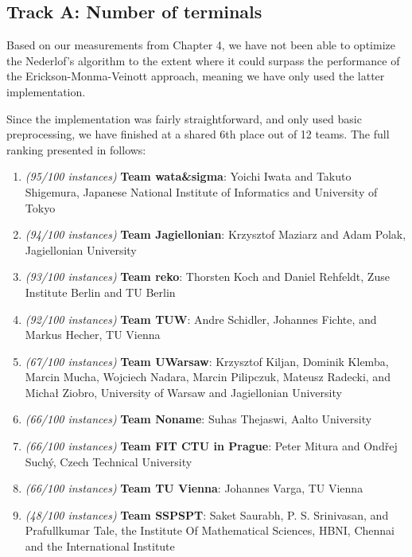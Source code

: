 \documentclass[thesis=M,english,hidelinks]{FITthesis}[2012/10/20]
\theoremstyle{definition}
\begin{document}
\subsection{Track A: Number of terminals}

Based on our measurements from Chapter 4, we have not been able to optimize the Nederlof's algorithm to the extent where
it could surpass the performance of the Erickson-Monma-Veinott approach, meaning we have only used the latter
implementation.

Since the implementation was fairly straightforward, and only used basic preprocessing, we have finished at a shared 6th
place out of 12 teams. The full ranking presented in \cite{PaceReport} follows:

\begin{enumerate}
    \item
        \emph{(95/100 instances)} \textbf{Team wata\&sigma}: Yoichi Iwata and Takuto Shigemura, Japanese
        National Institute of Informatics and University of Tokyo
    \item
        \emph{(94/100 instances)} \textbf{Team Jagiellonian}: Krzysztof Maziarz and Adam Polak, Jagiellonian University
    \item
        \emph{(93/100 instances)} \textbf{Team reko}: Thorsten Koch and Daniel Rehfeldt, Zuse Institute Berlin and TU Berlin
    \item
        \emph{(92/100 instances)} \textbf{Team TUW}: Andre Schidler, Johannes Fichte, and Markus Hecher, TU Vienna
    \item
        \emph{(67/100 instances)} \textbf{Team UWarsaw}: Krzysztof Kiljan, Dominik Klemba, Marcin Mucha, Wojciech Nadara, Marcin
        Pilipczuk, Mateusz Radecki, and Michał Ziobro, University of Warsaw and Jagiellonian University
    \item
        \emph{(66/100 instances)} \textbf{Team Noname}: Suhas Thejaswi, Aalto University
        \addtocounter{enumi}{-1}
    \item
        \emph{(66/100 instances)} \textbf{Team FIT CTU in Prague}: Peter Mitura and Ondřej Suchý, Czech Technical University
        \addtocounter{enumi}{-1}
    \item
        \emph{(66/100 instances)} \textbf{Team TU Vienna}: Johannes Varga, TU Vienna
        \addtocounter{enumi}{2}
    \item
        \emph{(48/100 instances)} \textbf{Team SSPSPT}: Saket Saurabh, P. S. Srinivasan, and Prafullkumar Tale,
        the Institute Of Mathematical Sciences, HBNI, Chennai and the International Institute

\end{enumerate}
\end{document}
